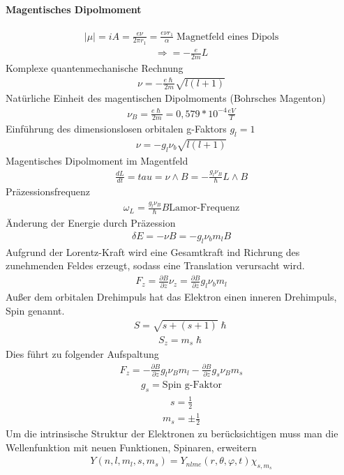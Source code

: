 \documentclass[10pt,a4paper]{article}
\begin{document}
\paragraph{Magentisches Dipolmoment}$\,$ \\
\begin{align}
\vert \mu \vert =i A = \frac{e\nu}{2 \pi r_1}=\frac{e \nu r_1}{\alpha} \;\text{Magnetfeld eines Dipols}
\end{align}
\begin{align}
\Rightarrow =-\frac{e}{2m}L
\end{align}
Komplexe quantenmechanische Rechnung
\begin{align}
\nu=-\frac{e \hslash}{2m}\sqrt{l(l+1)}
\end{align}
Natürliche Einheit des magentischen Dipolmoments (Bohrsches Magenton)
\begin{align}
\nu_B=\frac{e \hslash}{2m}=0,579*10^{-4} \frac{eV}{T}
\end{align}
Einführung des dimensionslosen orbitalen g-Faktors $g_l=1$
\begin{align}
\nu=-g_l\nu_b \sqrt{l(l+1)}
\end{align}
Magentisches Dipolmoment im Magentfeld
\begin{align}
\frac{dL}{dt}=tau=\nu \wedge B =-\frac{g_l \nu_B}{\hslash}L \wedge B
\end{align}
Präzessionsfrequenz
\begin{align}
\omega_L=\frac{g_l \nu_B}{\hslash} B \text{Lamor-Frequenz}
\end{align}
Änderung der Energie durch Präzession
\begin{align}
\delta E= -\nu B=-g_l \nu_b m_l B
\end{align}
Aufgrund der Lorentz-Kraft wird eine Gesamtkraft ind Richrung des zunehmenden Feldes erzeugt, sodass eine Translation verursacht wird.
\begin{align}
F_z=\frac{\partial B}{\partial z} \nu_z = \frac{\partial B}{\partial z} g_l \nu_b m_l
\end{align}
Außer dem orbitalen Drehimpuls hat das Elektron einen inneren Drehimpuls, Spin genannt.
\begin{align}
S=\sqrt{s+(s+1)} \hslash
\end{align}
\begin{align}
S_z=m_s \hslash
\end{align}
Dies führt zu folgender Aufspaltung
\begin{align}
F_z=-\frac{\partial B}{\partial z} g_l \nu_B m_l - \frac{\partial B}{\partial z} g_s \nu_B m_s
\end{align}
\begin{align}
g_s= \text{Spin g-Faktor}
\end{align}
\begin{align}
s=\frac{1}{2}
\end{align}
\begin{align}
m_s=\pm \frac{1}{2}
\end{align}
Um die intrinsische Struktur der Elektronen zu berücksichtigen muss man die Wellenfunktion mit neuen Funktionen, Spinaren, erweitern
\begin{align}
Y(n,l,m_l,s,m_s)=Y_{nlme}(r,\theta,\varphi,t) \chi_{s,m_s}
\end{align}
\end{document}
